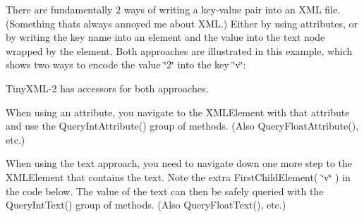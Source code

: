 

There are fundamentally 2 ways of writing a key-\/value pair into an X\+ML file. (Something that\textquotesingle{}s always annoyed me about X\+ML.) Either by using attributes, or by writing the key name into an element and the value into the text node wrapped by the element. Both approaches are illustrated in this example, which shows two ways to encode the value \char`\"{}2\char`\"{} into the key \char`\"{}v\char`\"{}\+:


\begin{DoxyCodeInclude}{0}

\end{DoxyCodeInclude}


Tiny\+X\+M\+L-\/2 has accessors for both approaches.

When using an attribute, you navigate to the X\+M\+L\+Element with that attribute and use the Query\+Int\+Attribute() group of methods. (Also Query\+Float\+Attribute(), etc.)


\begin{DoxyCodeInclude}{0}

\end{DoxyCodeInclude}


When using the text approach, you need to navigate down one more step to the X\+M\+L\+Element that contains the text. Note the extra First\+Child\+Element( \char`\"{}v\char`\"{} ) in the code below. The value of the text can then be safely queried with the Query\+Int\+Text() group of methods. (Also Query\+Float\+Text(), etc.)


\begin{DoxyCodeInclude}{0}

\end{DoxyCodeInclude}
 